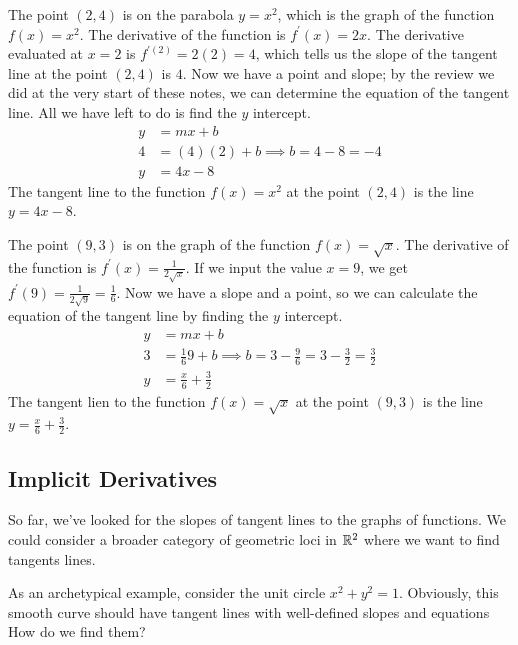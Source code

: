 \documentclass[fleqn]{report}
\begin{document}
\begin{example}
The point $(2,4)$ is on the parabola $y = x^2$, which is the
graph of the function $f(x) = x^2$. The derivative of the
function is $f^{\prime}(x) = 2x$. The derivative evaluated at
$x=2$ is $f^{\prime(2)} = 2(2) = 4$, which tells us the slope
of the tangent line at the point $(2,4)$ is $4$. Now we have a
point and slope; by the review we did at the very start of
these notes, we can determine the equation of the tangent
line. All we have left to do is find the $y$ intercept. 
\begin{align*}
y & = mx + b \\
4 & = (4)(2) + b \implies b = 4 - 8 = -4 \\
y & = 4x - 8 
\end{align*}
The tangent line to the function $f(x) = x^2$ at the point
$(2,4)$ is the line $y = 4x-8$. 
\end{example}

\begin{example}
The point $(9,3)$ is on the graph of the function $f(x) =
\sqrt{x}$. The derivative of the function is $f^{\prime}(x) =
\frac{1}{2\sqrt{x}}$. If we input the value $x=9$, we get
$f^{\prime}(9) = \frac{1}{2\sqrt{9}} = \frac{1}{6}$. Now we
have a slope and a point, so we can calculate the equation of
the tangent line by finding the $y$ intercept.
\begin{align*}
y & = mx + b \\
3 & = \frac{1}{6} 9 + b \implies b = 3 - \frac{9}{6} = 3 -
\frac{3}{2} = \frac{3}{2} \\
y & = \frac{x}{6} + \frac{3}{2}
\end{align*}
The tangent lien to the function $f(x) = \sqrt{x}$ at the
point $(9,3)$ is the line $y = \frac{x}{6} + \frac{3}{2}$. 
\end{example}

\subsection{Implicit Derivatives}
\label{implicit-derivatives}

So far, we've looked for the slopes of tangent lines to the
graphs of functions. We could  consider a broader category of
geometric loci in $\mathbb{R}^2$ where we want to find  tangents
lines.

As an archetypical example, consider the unit circle $x^2 +
y^2 =1$. Obviously, this smooth curve should have tangent
lines with well-defined slopes and equations How do we find
them?
\end{document}
